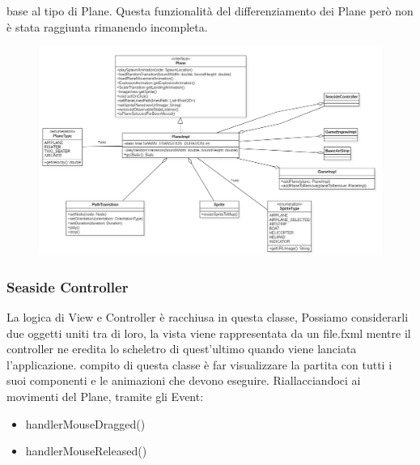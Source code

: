 \documentclass[a4paper,12pt]{report}
\begin{document}
base al tipo di Plane.
Questa funzionalità del differenziamento dei Plane però non è stata raggiunta rimanendo incompleta.
\begin{figure}[H]
    \begin{center}
        \centering
        \includegraphics[width=\textwidth]{img/Design/Rodilosso/Plane.png}
    \end{center}
    \label{img:planeuml}
\end{figure}

\subsubsection{Seaside Controller}
La logica di View e Controller è racchiusa in questa classe, 
Possiamo considerarli due oggetti uniti tra di loro, la vista viene rappresentata da un file.fxml mentre il controller ne eredita lo 
scheletro di quest’ultimo quando viene lanciata l’applicazione.
compito di questa classe è far visualizzare la partita con tutti i suoi componenti e le animazioni che devono eseguire.
Riallacciandoci ai movimenti del Plane, tramite gli Event:
\begin{itemize}
    \item handlerMouseDragged()
    \item handlerMouseReleased()
\end{itemize}
\end{document}
